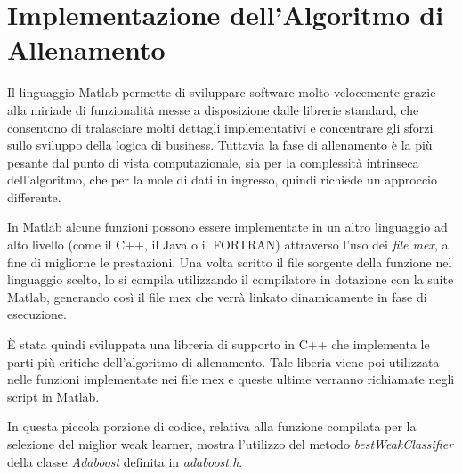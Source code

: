 \chapter{Implementazione dell'Algoritmo di Allenamento}
    Il linguaggio Matlab permette di sviluppare software molto velocemente grazie alla miriade di funzionalità messe a disposizione dalle librerie standard, che consentono di tralasciare molti dettagli implementativi e concentrare gli sforzi sullo sviluppo della logica di business.
    Tuttavia la fase di allenamento è la più pesante dal punto di vista computazionale, sia per la complessità intrinseca dell'algoritmo, che per la mole di dati in ingresso, quindi richiede un approccio differente.

    In Matlab alcune funzioni possono essere implementate in un altro linguaggio ad alto livello (come il C++, il Java o il FORTRAN) attraverso l'uso dei \emph{file mex}, al fine di migliorne le prestazioni.
    Una volta scritto il file sorgente della funzione nel linguaggio scelto, lo si compila utilizzando il compilatore in dotazione con la suite Matlab, generando così il file mex che verrà linkato dinamicamente in fase di esecuzione.

    È stata quindi sviluppata una libreria di supporto in C++ che implementa le parti più critiche dell'algoritmo di allenamento.
    Tale liberia viene poi utilizzata nelle funzioni implementate nei file mex e queste ultime verranno richiamate negli script in Matlab.

    

    In questa piccola porzione di codice, relativa alla funzione compilata per la selezione del miglior weak learner, mostra l'utilizzo del metodo \emph{bestWeakClassifier} della classe \emph{Adaboost} definita in \emph{adaboost.h}.